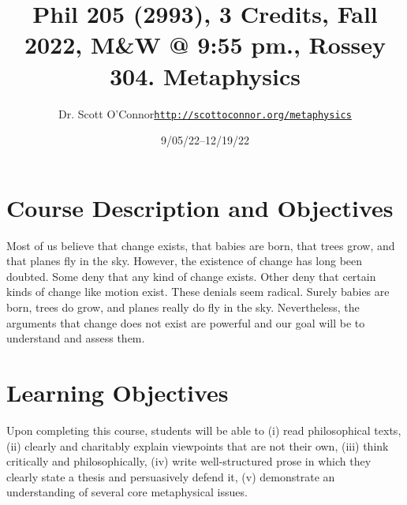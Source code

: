 \documentclass[article,oneside]{memoir}
\makeatletter
\def\myauthor{Author}
\def\mytitle{Title}
\def\mycopyright{\myauthor}
\def\myweb{\href{http://scottoconnor.org/metaphysics}{http://scottoconnor.org/metaphysics}}
\def\myauthor{Dr. Scott O'Connor}
\def\mytitle{{\normalsize Phil 205 (2993), 3 Credits, Fall 2022, M\&W @ 9:55 pm., Rossey 304. \newline} \HUGE Metaphysics}
\makeatother
\begin{document}
\setsansfont[Mapping=tex-text]{Georgia} 
\setmonofont[Mapping=tex-text,Scale=0.8]{Georgia} 

\def\ind{\hangindent=1 true cm\hangafter=1 \noindent}
\def\labelitemi{$\cdot$}

\pagestyle{kjh}

\title{\LARGE\mytitle}     
\author{\Large\myauthor \newline \footnotesize\texttt{\noindent\myweb}}
\date{9/05/22--12/19/22}

\published{\,}

\maketitle




%
%

\section{Course Description and Objectives}

Most of us believe that change exists, that babies are born, that trees grow, and that planes fly in the sky. However, the existence of change has long been doubted. Some deny that any kind of change exists. Other deny that certain kinds of change like motion exist. These denials seem radical. Surely babies are born, trees do grow, and planes really do fly in the sky. Nevertheless, the arguments that change does not exist are powerful and our goal will be to understand and assess them. 


\section{Learning Objectives}

Upon completing this course, students will be able to (i) read
philosophical texts, (ii) clearly and charitably explain viewpoints that
are not their own, (iii) think critically and philosophically, (iv)
write well-structured prose in which they clearly state a thesis and
persuasively defend it, (v) demonstrate an understanding of several core
metaphysical issues.
\end{document}
